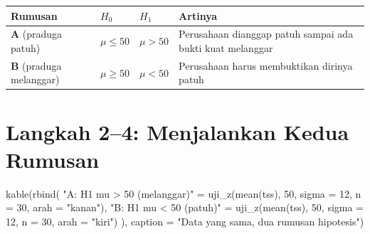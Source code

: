 \documentclass[
  indonesian,
  letterpaper,
]{book}
\newenvironment{Shaded}{\begin{snugshade}}{\end{snugshade}}
\newcommand{\AttributeTok}[1]{\textcolor[rgb]{0.40,0.45,0.13}{#1}}
\newcommand{\DecValTok}[1]{\textcolor[rgb]{0.68,0.00,0.00}{#1}}
\newcommand{\FunctionTok}[1]{\textcolor[rgb]{0.28,0.35,0.67}{#1}}
\newcommand{\NormalTok}[1]{\textcolor[rgb]{0.00,0.23,0.31}{#1}}
\newcommand{\OtherTok}[1]{\textcolor[rgb]{0.00,0.23,0.31}{#1}}
\newcommand{\StringTok}[1]{\textcolor[rgb]{0.13,0.47,0.30}{#1}}
\newcounter{none} %
\begin{document}
{\def\LTcaptype{none} %
\begin{longtable}[]{@{}
  >{\raggedright\arraybackslash}p{}
  >{\raggedright\arraybackslash}p{}
  >{\raggedright\arraybackslash}p{}
  >{\raggedright\arraybackslash}p{}@{}}
\toprule\noalign{}
\begin{minipage}[b]{\linewidth}\raggedright
Rumusan
\end{minipage} & \begin{minipage}[b]{\linewidth}\raggedright
\(H_0\)
\end{minipage} & \begin{minipage}[b]{\linewidth}\raggedright
\(H_1\)
\end{minipage} & \begin{minipage}[b]{\linewidth}\raggedright
Artinya
\end{minipage} \\
\midrule\noalign{}
\endhead
\bottomrule\noalign{}
\endlastfoot
\textbf{A} (praduga patuh) & \(\mu \leq 50\) & \(\mu > 50\) & Perusahaan
dianggap patuh sampai ada bukti kuat melanggar \\
\textbf{B} (praduga melanggar) & \(\mu \geq 50\) & \(\mu < 50\) &
Perusahaan harus membuktikan dirinya patuh \\
\end{longtable}
}

\section{Langkah 2--4: Menjalankan Kedua
Rumusan}\label{langkah-24-menjalankan-kedua-rumusan}

\begin{Shaded}
\begin{Highlighting}[]
\FunctionTok{kable}\NormalTok{(}\FunctionTok{rbind}\NormalTok{(}
  \StringTok{"A: H1 mu \textgreater{} 50 (melanggar)"} \OtherTok{=} \FunctionTok{uji\_z}\NormalTok{(}\FunctionTok{mean}\NormalTok{(tss), }\DecValTok{50}\NormalTok{, }\AttributeTok{sigma =} \DecValTok{12}\NormalTok{, }\AttributeTok{n =} \DecValTok{30}\NormalTok{, }\AttributeTok{arah =} \StringTok{"kanan"}\NormalTok{),}
  \StringTok{"B: H1 mu \textless{} 50 (patuh)"}     \OtherTok{=} \FunctionTok{uji\_z}\NormalTok{(}\FunctionTok{mean}\NormalTok{(tss), }\DecValTok{50}\NormalTok{, }\AttributeTok{sigma =} \DecValTok{12}\NormalTok{, }\AttributeTok{n =} \DecValTok{30}\NormalTok{, }\AttributeTok{arah =} \StringTok{"kiri"}\NormalTok{)}
\NormalTok{), }\AttributeTok{caption =} \StringTok{"Data yang sama, dua rumusan hipotesis"}\NormalTok{)}
\end{Highlighting}
\end{Shaded}
\end{document}
